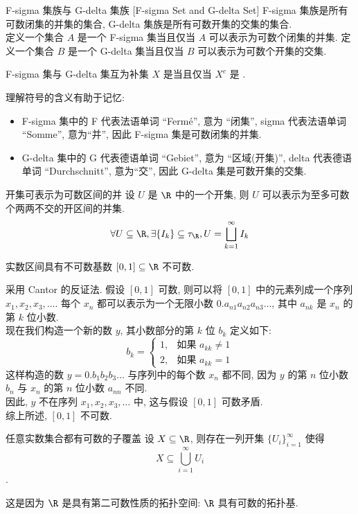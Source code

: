 \begin{xmp}
    {F-sigma 集族与 G-delta 集族}
    [F-sigma Set and G-delta Set]
    F-sigma 集族是所有可数闭集的并集的集合, G-delta 集族是所有可数开集的交集的集合.\\
    定义一个集合 \(A\) 是一个 F-sigma 集当且仅当 \(A\) 可以表示为可数个闭集的并集. 定义一个集合 \(B\) 是一个 G-delta 集当且仅当 \(B\) 可以表示为可数个开集的交集.
\end{xmp}
\begin{ppt}
    {F-sigma 集与 G-delta 集互为补集}
    \(X\) 是\Fsigma{}当且仅当 \(X^c\) 是 \Gdelta{}.
\end{ppt}
\begin{rmk}
    [AI]
    理解符号的含义有助于记忆:
    \begin{itemize}
        \item F-sigma 集中的 F 代表法语单词 ``Fermé'', 意为 ``闭集'', sigma 代表法语单词 ``Somme'', 意为``并'', 因此 F-sigma 集是可数闭集的并集.
        \item G-delta 集中的 G 代表德语单词 ``Gebiet'', 意为 ``区域(开集)'', delta 代表德语单词 ``Durchschnitt'', 意为``交'', 因此 G-delta 集是可数开集的交集.
    \end{itemize}
\end{rmk}
\begin{ppt}
    {开集可表示为可数区间的并}
    设 \(U\) 是 \(\R\) 中的一个开集, 则 \(U\) 可以表示为至多可数个两两不交的开区间的并集.
    \[\forall U\subseteq\R, \exists\{I_k\}\subseteq\tau_{\R}, U=\bigsqcup_{k=1}^\infty I_k\]
\end{ppt}
\begin{ppt}
    {实数区间具有不可数基数}
    \([0,1]\subseteq\R\) 不可数.
\end{ppt}
\begin{prf}
    采用 Cantor 的反证法. 假设 \([0,1]\) 可数, 则可以将 \([0,1]\) 中的元素列成一个序列 \(x_1, x_2, x_3, \ldots\). 每个 \(x_n\) 都可以表示为一个无限小数 \(0.a_{n1}a_{n2}a_{n3}\ldots\), 其中 \(a_{nk}\) 是 \(x_n\) 的第 \(k\) 位小数.\\
    现在我们构造一个新的数 \(y\), 其小数部分的第 \(k\) 位 \(b_k\) 定义如下:
    \[b_k = \begin{cases}
        1, & \text{如果 } a_{kk} \neq 1 \\
        2, & \text{如果 } a_{kk} = 1
    \end{cases}\]
    这样构造的数 \(y = 0.b_1b_2b_3\ldots\) 与序列中的每个数 \(x_n\) 都不同, 因为 \(y\) 的第 \(n\) 位小数 \(b_n\) 与 \(x_n\) 的第 \(n\) 位小数 \(a_{nn}\) 不同.\\
    因此, \(y\) 不在序列 \(x_1, x_2, x_3, \ldots\) 中, 这与假设 \([0,1]\) 可数矛盾.\\
    综上所述, \([0,1]\) 不可数.
\end{prf}
\begin{thm}
    {任意实数集合都有可数的子覆盖}
    设 \(X\subseteq\R\), 则存在一列开集 \(\{U_i\}_{i=1}^\infty\) 使得 \[X \subseteq \bigcup_{i=1}^\infty U_i\].
\end{thm}
\begin{rmk}
    这是因为 \(\R\) 是具有第二可数性质的拓扑空间: \(\R\) 具有可数的拓扑基.
\end{rmk}
